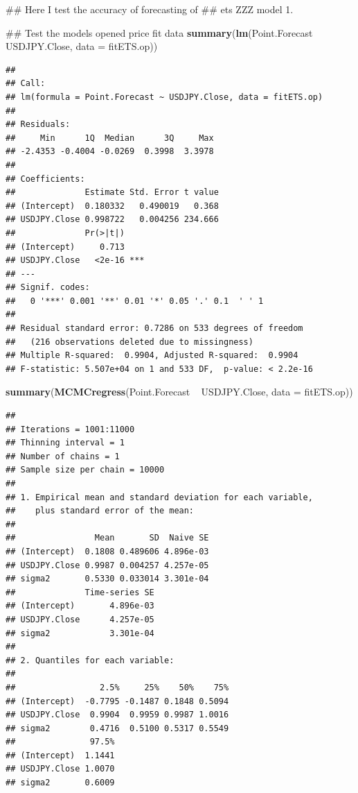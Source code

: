 \documentclass[]{tufte-book}
\newenvironment{Shaded}{}{}
\newcommand{\KeywordTok}[1]{\textcolor[rgb]{0.00,0.44,0.13}{\textbf{#1}}}
\newcommand{\DataTypeTok}[1]{\textcolor[rgb]{0.56,0.13,0.00}{#1}}
\newcommand{\StringTok}[1]{\textcolor[rgb]{0.25,0.44,0.63}{#1}}
\newcommand{\OperatorTok}[1]{\textcolor[rgb]{0.40,0.40,0.40}{#1}}
\newcommand{\NormalTok}[1]{#1}
\begin{document}
\begin{Shaded}
\begin{Highlighting}[]
\NormalTok{## Here I test the accuracy of forecasting of}
\NormalTok{## ets ZZZ model 1.}

\NormalTok{## Test the models opened price fit data}
\KeywordTok{summary}\NormalTok{(}\KeywordTok{lm}\NormalTok{(Point.Forecast }\OperatorTok{~}\StringTok{ }\NormalTok{USDJPY.Close, }\DataTypeTok{data =}\NormalTok{ fitETS.op))}
\end{Highlighting}
\end{Shaded}

\begin{verbatim}
## 
## Call:
## lm(formula = Point.Forecast ~ USDJPY.Close, data = fitETS.op)
## 
## Residuals:
##     Min      1Q  Median      3Q     Max 
## -2.4353 -0.4004 -0.0269  0.3998  3.3978 
## 
## Coefficients:
##              Estimate Std. Error t value
## (Intercept)  0.180332   0.490019   0.368
## USDJPY.Close 0.998722   0.004256 234.666
##              Pr(>|t|)    
## (Intercept)     0.713    
## USDJPY.Close   <2e-16 ***
## ---
## Signif. codes:  
##   0 '***' 0.001 '**' 0.01 '*' 0.05 '.' 0.1  ' ' 1
## 
## Residual standard error: 0.7286 on 533 degrees of freedom
##   (216 observations deleted due to missingness)
## Multiple R-squared:  0.9904, Adjusted R-squared:  0.9904 
## F-statistic: 5.507e+04 on 1 and 533 DF,  p-value: < 2.2e-16
\end{verbatim}

\begin{Shaded}
\begin{Highlighting}[]
\KeywordTok{summary}\NormalTok{(}\KeywordTok{MCMCregress}\NormalTok{(Point.Forecast }\OperatorTok{~}\StringTok{ }\NormalTok{USDJPY.Close, }
    \DataTypeTok{data =}\NormalTok{ fitETS.op))}
\end{Highlighting}
\end{Shaded}

\begin{verbatim}
## 
## Iterations = 1001:11000
## Thinning interval = 1 
## Number of chains = 1 
## Sample size per chain = 10000 
## 
## 1. Empirical mean and standard deviation for each variable,
##    plus standard error of the mean:
## 
##                Mean       SD  Naive SE
## (Intercept)  0.1808 0.489606 4.896e-03
## USDJPY.Close 0.9987 0.004257 4.257e-05
## sigma2       0.5330 0.033014 3.301e-04
##              Time-series SE
## (Intercept)       4.896e-03
## USDJPY.Close      4.257e-05
## sigma2            3.301e-04
## 
## 2. Quantiles for each variable:
## 
##                 2.5%     25%    50%    75%
## (Intercept)  -0.7795 -0.1487 0.1848 0.5094
## USDJPY.Close  0.9904  0.9959 0.9987 1.0016
## sigma2        0.4716  0.5100 0.5317 0.5549
##               97.5%
## (Intercept)  1.1441
## USDJPY.Close 1.0070
## sigma2       0.6009
\end{verbatim}
\end{document}
